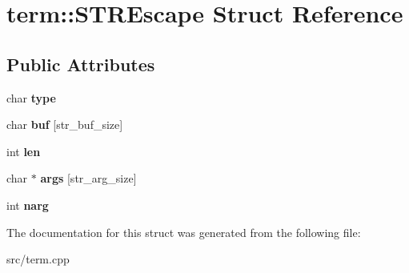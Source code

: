 \hypertarget{structterm_1_1STREscape}{}\section{term\+::S\+T\+R\+Escape Struct Reference}
\label{structterm_1_1STREscape}
\subsection*{Public Attributes}
\begin{DoxyCompactItemize}
\item 
\mbox{\label{structterm_1_1STREscape_ab2991e30435db4ffc1230baa8404561c}} 
char {\bfseries type}
\item 
\mbox{\label{structterm_1_1STREscape_a3ac053ebe5ed6ce7dd622acfe353acda}} 
char {\bfseries buf} \mbox{[}str\+\_\+buf\+\_\+size\mbox{]}
\item 
\mbox{\label{structterm_1_1STREscape_af012c39b8bd16d57d73f78bdf13a07d0}} 
int {\bfseries len}
\item 
\mbox{\label{structterm_1_1STREscape_abaab200df586c380db0b41dafba6dadb}} 
char $\ast$ {\bfseries args} \mbox{[}str\+\_\+arg\+\_\+size\mbox{]}
\item 
\mbox{\label{structterm_1_1STREscape_a03cb58742925ece0851ff4040fc228b9}} 
int {\bfseries narg}
\end{DoxyCompactItemize}


The documentation for this struct was generated from the following file\+:\begin{DoxyCompactItemize}
\item 
src/term.\+cpp\end{DoxyCompactItemize}
